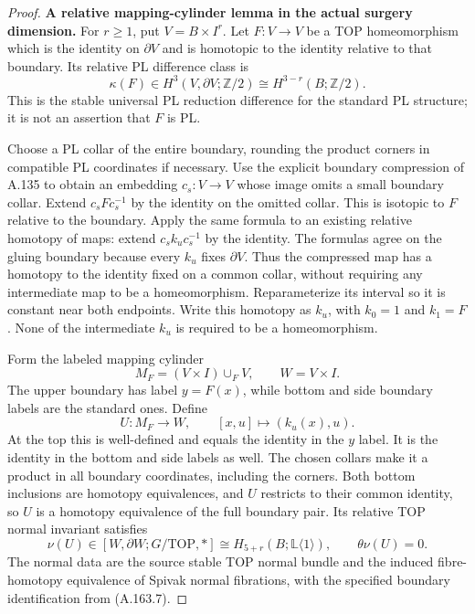 \begin{proof}
\textbf{A relative mapping-cylinder lemma in the actual surgery dimension.}
For $r\ge1$, put $V=B\times I^r$. Let $F:V\to V$ be a TOP
homeomorphism which is the identity on $\partial V$ and is homotopic
to the identity relative to that boundary. Its relative PL difference
class is
\[
 \kappa(F)\in H^3(V,\partial V;\mathbb Z/2)
                   \cong H^{3-r}(B;\mathbb Z/2).                   \tag{A.163.6}
\]
This is the stable universal PL reduction difference for the standard
PL structure; it is not an assertion that $F$ is PL.

Choose a PL collar of the entire boundary, rounding the product corners
in compatible PL coordinates if necessary. Use the explicit boundary
compression of A.135 to obtain an embedding $c_s:V\to V$ whose image
omits a small boundary collar. Extend $c_sFc_s^{-1}$ by the identity
on the omitted collar. This is isotopic to $F$ relative to the boundary.
Apply the same formula to an existing relative homotopy of maps:
extend $c_sk_uc_s^{-1}$ by the identity. The formulas agree on the
gluing boundary because every $k_u$ fixes $\partial V$. Thus the
compressed map has a homotopy to the identity fixed on a common collar,
without requiring any intermediate map to be a homeomorphism.
Reparameterize its interval so it
is constant near both endpoints. Write this homotopy as $k_u$, with
$k_0=1$ and $k_1=F$. None of the intermediate $k_u$ is required to be
a homeomorphism.

Form the labeled mapping cylinder
\[
 M_F=(V\times I)\cup_F V,\qquad W=V\times I.
\]
The upper boundary has label $y=F(x)$, while bottom and side boundary
labels are the standard ones. Define
\[
 U:M_F\longrightarrow W,\qquad [x,u]\longmapsto(k_u(x),u).          \tag{A.163.7}
\]
At the top this is well-defined and equals the identity in the $y$
label. It is the identity in the bottom and side labels as well.
The chosen collars make it a product in all boundary coordinates,
including the corners. Both bottom inclusions are homotopy
equivalences, and $U$ restricts to their common identity, so $U$ is a
homotopy equivalence of the full boundary pair. Its relative TOP normal
invariant satisfies
\[
 \nu(U)\in[W,\partial W;G/\mathrm{TOP},*]
       \cong H_{5+r}(B;\mathbb L\langle1\rangle),
 \qquad \theta\nu(U)=0.                                          \tag{A.163.8}
\]
The normal data are the source stable TOP normal bundle and the
induced fibre-homotopy equivalence of Spivak normal fibrations, with
the specified boundary identification from (A.163.7).


\end{proof}
